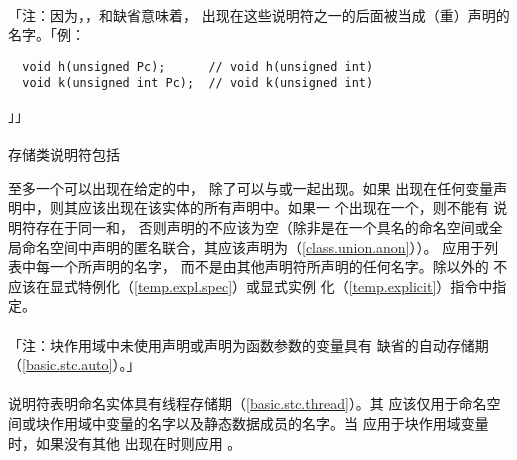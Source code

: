 \paragraph{}
「注：因为，，和缺省意味着，
出现在这些说明符之一的后面被当成（重）声明的名字。「例：
\begin{lstlisting}
  void h(unsigned Pc);      // void h(unsigned int)
  void k(unsigned int Pc);  // void k(unsigned int)
\end{lstlisting}」」

\paragraph{}
存储类说明符包括


至多一个可以出现在给定的中，
除了可以与或一起出现。如果
出现在任何变量声明中，则其应该出现在该实体的所有声明中。如果一
个出现在一个，则不能有
说明符存在于同一和，
否则声明的不应该为空（除非是在一个具名的命名空间或全
局命名空间中声明的匿名联合，其应该声明为（\ref{class.union.anon}））。
应用于列表中每一个所声明的名字，
而不是由其他声明符所声明的任何名字。除以外的
不应该在显式特例化（\ref{temp.expl.spec}）或显式实例
化（\ref{temp.explicit}）指令中指定。

\paragraph{}
「注：块作用域中未使用声明或声明为函数参数的变量具有
缺省的自动存储期（\ref{basic.stc.auto}）。」

\paragraph{}
说明符表明命名实体具有线程存储期（\ref{basic.stc.thread}）。其
应该仅用于命名空间或块作用域中变量的名字以及静态数据成员的名字。当
应用于块作用域变量时，如果没有其他
出现在时则应用 。

